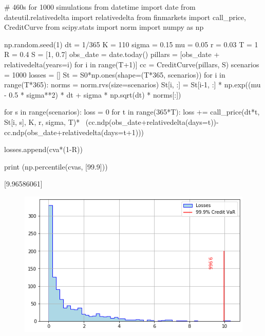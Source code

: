 \cprotEnv\begin{solution}

\begin{ipython}
# 460s for 1000 simulations
from datetime import date
from dateutil.relativedelta import relativedelta
from finmarkets import call_price, CreditCurve
from scipy.stats import norm
import numpy as np

np.random.seed(1)
dt = 1/365
K = 110
sigma = 0.15
mu = 0.05
r = 0.03
T = 1
R = 0.4
S = [1, 0.7]
obs_date = date.today()
pillars = [obs_date + relativedelta(years=i) for i in range(T+1)]
cc = CreditCurve(pillars, S)
scenarios = 1000
losses = []
St = S0*np.ones(shape=(T*365, scenarios))
for i in range(T*365):
    norms = norm.rvs(size=scenarios)
    St[i, :] = St[i-1, :] * np.exp((mu - 0.5 * sigma**2) * dt + sigma
        * np.sqrt(dt) * norms[:])

for s in range(scenarios):
    loss = 0
    for t in range(365*T):
        loss += call_price(dt*t, St[i, s], K, r, sigma, T)* \
            (cc.ndp(obs_date+relativedelta(days=t))-
             cc.ndp(obs_date+relativedelta(days=t+1)))

        losses.append(cva*(1-R))

print (np.percentile(cvas, [99.9]))

[9.96586061]
\end{ipython}

\begin{figure}[htbp]
	\centering
\includegraphics[width=0.7\linewidth]{figures/cr_var_ex}
\end{figure}
\end{solution}





